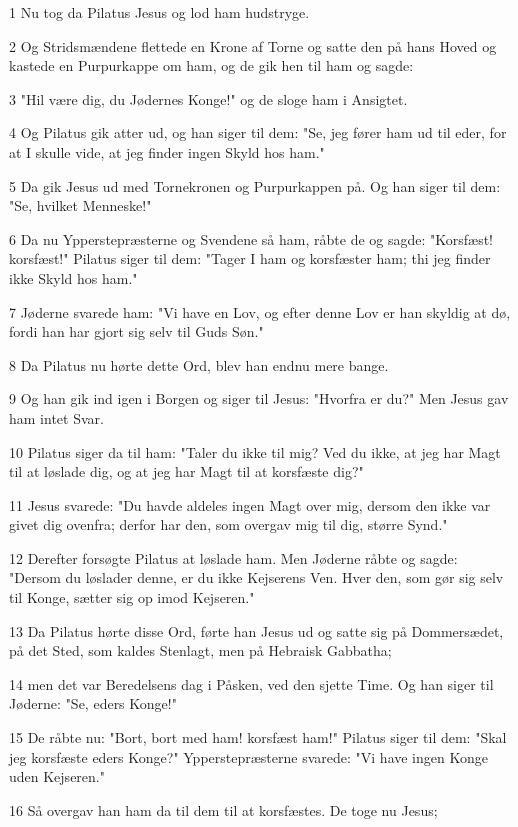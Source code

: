 \par 1 Nu tog da Pilatus Jesus og lod ham hudstryge.
\par 2 Og Stridsmændene flettede en Krone af Torne og satte den på hans Hoved og kastede en Purpurkappe om ham, og de gik hen til ham og sagde:
\par 3 "Hil være dig, du Jødernes Konge!" og de sloge ham i Ansigtet.
\par 4 Og Pilatus gik atter ud, og han siger til dem: "Se, jeg fører ham ud til eder, for at I skulle vide, at jeg finder ingen Skyld hos ham."
\par 5 Da gik Jesus ud med Tornekronen og Purpurkappen på. Og han siger til dem: "Se, hvilket Menneske!"
\par 6 Da nu Ypperstepræsterne og Svendene så ham, råbte de og sagde: "Korsfæst! korsfæst!" Pilatus siger til dem: "Tager I ham og korsfæster ham; thi jeg finder ikke Skyld hos ham."
\par 7 Jøderne svarede ham: "Vi have en Lov, og efter denne Lov er han skyldig at dø, fordi han har gjort sig selv til Guds Søn."
\par 8 Da Pilatus nu hørte dette Ord, blev han endnu mere bange.
\par 9 Og han gik ind igen i Borgen og siger til Jesus: "Hvorfra er du?" Men Jesus gav ham intet Svar.
\par 10 Pilatus siger da til ham: "Taler du ikke til mig? Ved du ikke, at jeg har Magt til at løslade dig, og at jeg har Magt til at korsfæste dig?"
\par 11 Jesus svarede: "Du havde aldeles ingen Magt over mig, dersom den ikke var givet dig ovenfra; derfor har den, som overgav mig til dig, større Synd."
\par 12 Derefter forsøgte Pilatus at løslade ham. Men Jøderne råbte og sagde: "Dersom du løslader denne, er du ikke Kejserens Ven. Hver den, som gør sig selv til Konge, sætter sig op imod Kejseren."
\par 13 Da Pilatus hørte disse Ord, førte han Jesus ud og satte sig på Dommersædet, på det Sted, som kaldes Stenlagt, men på Hebraisk Gabbatha;
\par 14 men det var Beredelsens dag i Påsken, ved den sjette Time. Og han siger til Jøderne: "Se, eders Konge!"
\par 15 De råbte nu: "Bort, bort med ham! korsfæst ham!" Pilatus siger til dem: "Skal jeg korsfæste eders Konge?" Ypperstepræsterne svarede: "Vi have ingen Konge uden Kejseren."
\par 16 Så overgav han ham da til dem til at korsfæstes. De toge nu Jesus;
